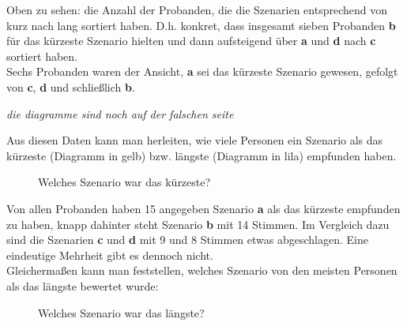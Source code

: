 \documentclass{Paper}
\begin{document}
Oben zu sehen: die Anzahl der Probanden, die die Szenarien entsprechend von kurz nach lang sortiert haben. D.h. konkret, dass insgesamt sieben Probanden   \textbf{b} für das kürzeste Szenario hielten und dann aufsteigend über \textbf{a} und \textbf{d} nach  \textbf{c} sortiert haben. \\
Sechs Probanden waren der Ansicht, \textbf{a} sei das kürzeste Szenario gewesen, gefolgt von \textbf{c}, \textbf{d} und schließlich \textbf{b}. 

\textit{die diagramme sind noch auf der falschen seite}
	
Aus diesen Daten kann man herleiten, wie viele Personen ein Szenario als das kürzeste (Diagramm in gelb) bzw. längste (Diagramm in lila) empfunden haben. 

\begin{figure}[ht]
\caption{Welches Szenario war das kürzeste?}
\label{SzenarienKurz}
\end{figure}
	
Von allen Probanden haben 15 angegeben Szenario \textbf{a} als das kürzeste empfunden zu haben, knapp dahinter steht Szenario \textbf{b} mit 14 Stimmen. Im Vergleich dazu sind die Szenarien \textbf{c} und \textbf{d} mit 9 und 8 Stimmen etwas abgeschlagen. Eine eindeutige Mehrheit gibt es dennoch nicht.\\
Gleichermaßen kann man feststellen, welches Szenario von den meisten Personen als das längste bewertet wurde:

\begin{figure}[ht]
\caption{Welches Szenario war das längste?}
\label{SzenarienLang}
\end{figure}	
\end{document}
